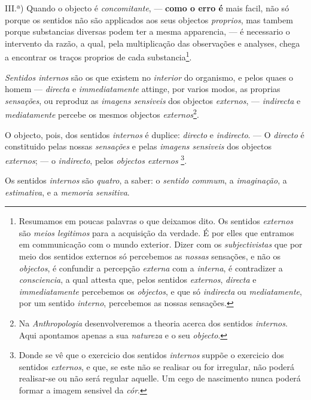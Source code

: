 III.ª) Quando o objecto é \emph{concomitante}, --- \textbf{como o erro é}   mais facil, não só porque os sentidos não são applicados aos seus objectos \emph{proprios}, mas tambem porque substancias diversas   podem ter a mesma apparencia, --- é necessario o intervento da razão, a qual, pela multiplicação das observações e analyses, chega a encontrar os traços proprios de cada substancia\footnote{Resumamos em poucas palavras o que deixamos dito. Os sentidos \emph{externos} são \emph{meios legitimos} para a acquisição da verdade. É por elles que entramos em communicação com o mundo exterior. Dizer com os \emph{subjectivistas} que por meio dos sentidos externos só percebemos as \emph{nossas} sensações, e não os \emph{objectos}, é confundir a percepção \emph{externa} com a \emph{interna}, é contradizer a \emph{consciencia}, a qual attesta que, pelos sentidos \emph{externos}, \emph{directa} e \emph{immediatamente} percebemos os \emph{objectos}, e que só \emph{indirecta} ou \emph{mediatamente}, por um sentido \emph{interno}, percebemos as nossas sensações.}.


\emph{Sentidos internos} são os que existem no \emph{interior} do organismo, e pelos quaes o homem --- \emph{directa} e \emph{immediatamente} attinge, por varios modos, as proprias \emph{sensações}, ou reproduz as \emph{imagens sensiveis} dos objectos \emph{externos}, --- \emph{indirecta} e \emph{mediatamente} percebe os mesmos objectos \emph{externos}\footnote{Na \emph{Anthropologia} desenvolveremos a theoria acerca dos sentidos \emph{internos}. Aqui apontamos apenas a sua \emph{natureza} e o seu \emph{objecto}.}.


 
O objecto, pois, dos sentidos \emph{internos} é duplice: \emph{directo} e \emph{indirecto}. --- O \emph{directo} é constituido pelas nossas \emph{sensações} e pelas \emph{imagens sensiveis} dos objectos \emph{externos}; --- o \emph{indirecto}, pelos \emph{objectos externos} \footnote{Donde se vê que o exercicio dos sentidos \emph{internos} suppõe o exercicio dos sentidos \emph{externos}, e que, se este não se realisar ou for irregular, não poderá realisar-se ou não será regular aquelle. Um cego de nascimento nunca poderá formar a imagem sensivel da \emph{cór}.}.


Os sentidos \emph{internos} são \emph{quatro}, a saber: o \emph{sentido commum}, a \emph{imaginação}, a \emph{estimativa}, e a \emph{memoria sensitiva}.

